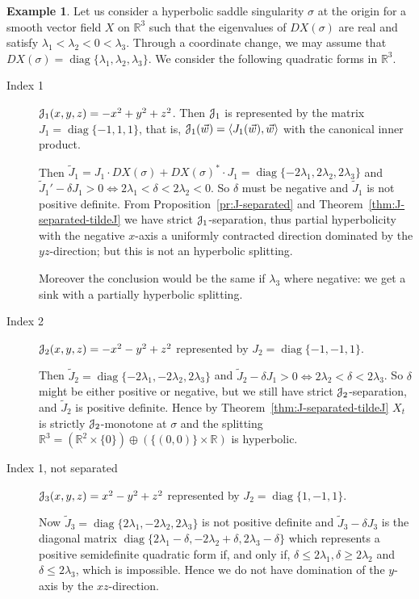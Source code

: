 \documentclass[12pt,reqno]{amsart}
\numberwithin{equation}{section}
\theoremstyle{plain}
\theoremstyle{definition}
\newtheorem{example}{Example}
\newcommand{\RR}{{\mathbb R}}
\newcommand{\diag}{\operatorname{diag}}
\newcommand{\J}{\EuScript{J}}
\begin{document}
\begin{example}\label{ex:Lorenz-like-J}
  Let us consider a hyperbolic saddle singularity
  $\sigma$ at the origin for a smooth vector field $X$
  on $\RR^3$ such that the eigenvalues of $DX(\sigma)$
  are real and satisfy
  $\lambda_1<\lambda_2<0<\lambda_3$. Through a
  coordinate change, we may assume that
  $DX(\sigma)=\diag\{\lambda_1,\lambda_2,\lambda_3\}$. We
  consider the following quadratic forms in $\RR^3$.
  \begin{description}
  \item[Index 1] $\J_1(x,y,z)=-x^2+y^2+z^2$. Then $\J_1$ is
    represented by the matrix $J_1=\diag\{-1,1,1\}$,
    that is, $\J_1(\vec w)=\langle J_1(\vec w),\vec
    w\rangle$ with the canonical inner product.

  Then $\tilde J_1=J_1\cdot
  DX(\sigma)+DX(\sigma)^*\cdot
  J_1=\diag\{-2\lambda_1,2\lambda_2,2\lambda_3\}$ and
  $\tilde J_1'-\delta J_1>0\iff
  2\lambda_1<\delta<2\lambda_2<0$. So $\delta$ must be
  negative and $\tilde J_1$ is not positive
  definite. From Proposition~\ref{pr:J-separated} and
  Theorem~\ref{thm:J-separated-tildeJ} we have
  strict $\J_1$-separation, thus partial hyperbolicity
  with the negative $x$-axis a uniformly contracted
  direction dominated by the $yz$-direction; but this
  is not an hyperbolic splitting.

  Moreover the conclusion would be the same if
  $\lambda_3$ where negative: we get a sink with a
  partially hyperbolic splitting.

  \item[Index 2] $\J_2(x,y,z)=-x^2-y^2+z^2$ represented
    by $J_2=\diag\{-1,-1,1\}$.

  Then $\tilde
  J_2=\diag\{-2\lambda_1,-2\lambda_2,2\lambda_3\}$ and
  $\tilde J_2-\delta J_1>0 \iff
  2\lambda_2<\delta<2\lambda_3$. So $\delta$ might be
  either positive or negative, but we still have strict
  $\J_2$-separation, and $\tilde J_2$ is positive
  definite. Hence by
  Theorem~\ref{thm:J-separated-tildeJ} $X_t$ is
  strictly $\J_2$-monotone at $\sigma$ and the
  splitting
  $\RR^3=(\RR^2\times\{0\})\oplus(\{(0,0)\}\times\RR)$
  is hyperbolic.


  \item[Index 1, not separated]
    $\J_3(x,y,z)=x^2-y^2+z^2$ represented by
    $J_2=\diag\{1,-1,1\}$.

  Now $\tilde
  J_3=\diag\{2\lambda_1,-2\lambda_2,2\lambda_3\}$ is
  not positive definite and $\tilde J_3-\delta J_3$ is
  the diagonal matrix
  $\diag\{2\lambda_1-\delta,-2\lambda_2+\delta,2\lambda_3-\delta\}$
  which represents a positive semidefinite quadratic
  form if, and only if, $\delta\le2\lambda_1,
  \delta\ge2\lambda_2$ and $\delta\le2\lambda_3$, which
  is impossible. Hence we do not have domination of the
  $y$-axis by the $xz$-direction.
\end{description}
\end{example}
\end{document}
